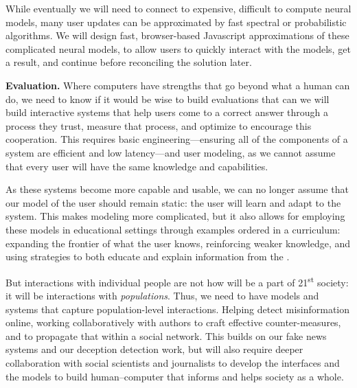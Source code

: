 While eventually we will need to connect to expensive, difficult to
compute neural models, many user updates can be approximated by fast
spectral or probabilistic algorithms.
%
We will design fast, browser-based Javascript approximations of these
complicated neural models, to allow users to quickly interact with the
models, get a result, and continue before reconciling the solution later.
%

{\bf Evaluation.}
%
Where computers have strengths that go beyond what a human can do, we
need to know if it would be wise to build evaluations that can we
will build interactive systems that help users come to a correct
answer through a process they trust, measure that process, and
optimize to encourage this cooperation.
%
This requires basic engineering---ensuring all of the components of
a system are efficient and low latency---and user modeling, as we
cannot assume that every user will have the same knowledge and
capabilities.
%
%

As these systems become more capable and usable, we can no longer
assume that our model of the user should remain static: the user will
learn and adapt to the system.
%
This makes modeling more complicated, but it also allows for employing
these models in educational settings through examples ordered in a
curriculum: expanding the frontier of what the user knows, reinforcing
weaker knowledge, and using strategies to both educate and explain
information from the .
%

But interactions with individual people are not how  will be a
part of 21\textsuperscript{st} society: it will be interactions with
\emph{populations}.
%
Thus, we need to have models and systems that capture population-level
interactions.
%
Helping detect misinformation online, working collaboratively with
authors to craft effective counter-measures, and to propagate that
within a social network.
%
This builds on our fake news systems and our deception detection work,
but will also require deeper collaboration with social scientists and
journalists to develop the interfaces and the models to build
human--computer  that informs and helps society as a whole.


